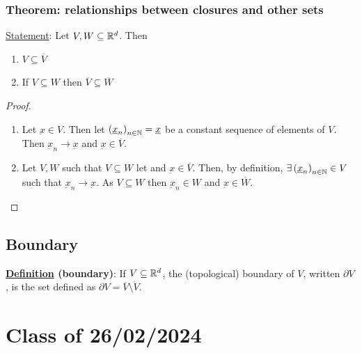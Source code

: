 \documentclass[10pt]{extarticle}
\renewcommand{\vec}[1]{\underbar{\ensuremath{#1}}}
\begin{document}
                \subsubsection{Theorem: relationships between closures and other sets}

                \underline{Statement}: Let $V, W \subseteq \mathbb{R}^d$.
                Then

                \begin{enumerate}
                    \item $V \subseteq \overline{V}$
                    \item If $V \subseteq W$ then $\overline{V} \subseteq \overline{W}$
                \end{enumerate}

                \begin{proof}
                    \skiplineafterproof
                    \begin{enumerate}
                        \item Let $\vec{x} \in V$.
                              Then let $\left(\vec{x}_n\right)_{n \in \N} = \vec{x}$ be a constant sequence of elements of $V$.
                              Then $\vec{x}_n \to \vec{x}$ and $\vec{x} \in \overline{V}$.
                        \item Let $V, W$ such that $V \subseteq W$ let and $\vec{x} \in \overline{V}$.
                              Then, by definition, $\exists \left(\vec{x}_n\right)_{n \in \N} \in V$ such that $\vec{x}_n \to \vec{x}$.
                              As $V \subseteq W$ then $\vec{x}_n \in W$ and $\vec{x} \in \overline{W}$.
                    \end{enumerate}
                \end{proof}

                \subsection{Boundary}

                \textbf{\underline{Definition} (boundary)}:
                If $V \subseteq \mathbb{R}^d$, the (topological) boundary of $V$, written $\partial V$, is the set defined as $\partial V = \overline{V} \setminus \mathring{V}$.

                \section{Class of 26/02/2024}
\end{document}
